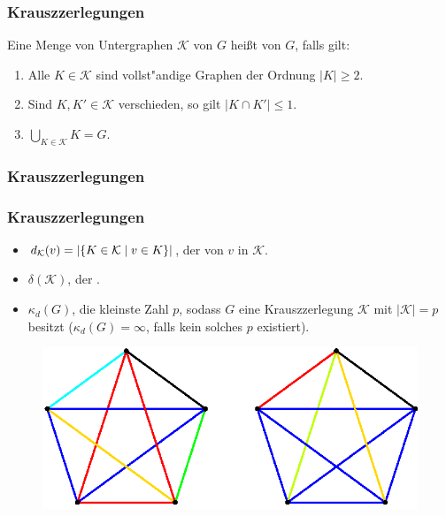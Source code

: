 \documentclass{beamer}
\begin{document}
\begin{frame}[<+->]
  \frametitle{Krauszzerlegungen}
    Eine Menge von Untergraphen $\mathcal{K}$ von $G$ hei{\ss}t  von $G$, falls gilt:
    \pause
    \begin{enumerate}[<+->]
      \item Alle $K\in \mathcal{K}$ sind vollst"andige Graphen der Ordnung $|K| \geq 2$.
      \item Sind $K,K'\in \mathcal{K}$ verschieden, so gilt $|K\cap K'| \leq 1$.
      \item $\bigcup\limits_{K\in \mathcal{K}} K = G$.
    \end{enumerate}
\end{frame}

\begin{frame}
  \frametitle{Krauszzerlegungen}
  
\end{frame}

\begin{frame}[<+->]
  \frametitle{Krauszzerlegungen}
  \begin{itemize}[<+->]
    \item $d_{\mathcal{K}}(v) = | \{K\in \mathcal{K} \;|\; v\in K \}| $, der  von $v$ in $\mathcal{K}$.
    \item $\delta(\mathcal{K})$, der  .
    \item $\kappa_{d}(G)$, die kleinste Zahl $p$, sodass $G$ eine Krauszzerlegung $\mathcal{K}$ mit $|\mathcal{K}| = p$ besitzt ($\kappa_{d}(G) = \infty$, falls kein solches $p$ existiert).
  \end{itemize}
   {
  \begin{figure}[h]
    \centering
    \includegraphics[width=\textwidth]{images/k5krauszdecomp}
  \end{figure} }
\end{frame}
\end{document}
